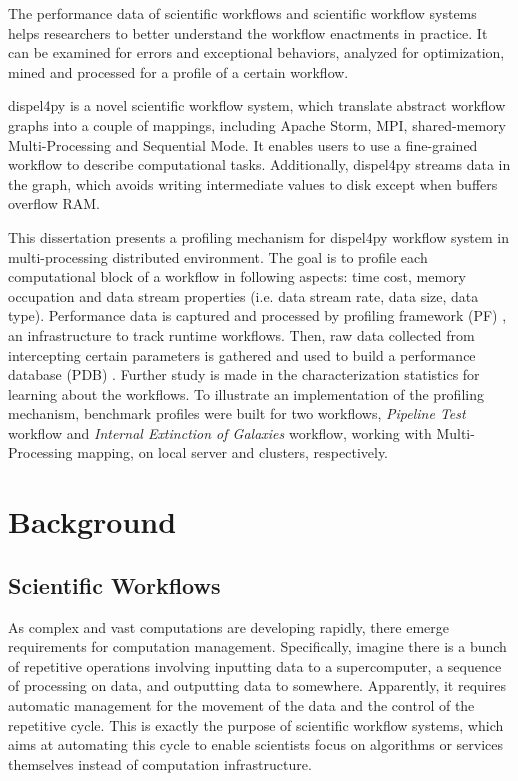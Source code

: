 \documentclass[10pt,twoside,openright,logo]{report}
\begin{document}
The performance data of scientific workflows and scientific workflow systems helps researchers to better understand the workflow enactments in practice. It can be examined for errors and exceptional behaviors, analyzed for optimization, mined and processed for a profile of a certain workflow.

dispel4py\cite{1} is a novel scientific workflow system, which translate abstract workflow graphs into a couple of mappings, including Apache Storm, MPI, shared-memory Multi-Processing and Sequential Mode. It enables users to use a fine-grained workflow to describe computational tasks. Additionally, dispel4py streams data in the graph, which avoids writing intermediate values to disk except when buffers overflow RAM.

This dissertation presents a profiling mechanism for dispel4py workflow system in multi-processing distributed environment. The goal is to profile each computational block of a workflow in following aspects: time cost, memory occupation and data stream properties (i.e. data stream rate, data size, data type). Performance data is captured and processed by profiling framework (PF) , an infrastructure to track runtime workflows. Then, raw data collected from intercepting certain parameters is gathered and used to build a performance database (PDB) . Further study is made in the characterization statistics for learning about the workflows. To illustrate an implementation of the profiling mechanism, benchmark profiles were built for two workflows, \textit{Pipeline Test} workflow and \textit{Internal Extinction of Galaxies} workflow, working with Multi-Processing mapping, on local server and clusters, respectively.


\chapter{Background}
\figone
\section{Scientific Workflows}
As complex and vast computations are developing rapidly, there emerge requirements for computation management. Specifically, imagine there is a bunch of repetitive operations involving inputting data to a supercomputer, a sequence of processing on data, and outputting data to somewhere. Apparently, it requires automatic management for the movement of the data and the control of the repetitive cycle. This is exactly the purpose of scientific workflow systems, which aims at automating this cycle to enable scientists focus on algorithms or services themselves instead of computation infrastructure\cite{2}.
\end{document}

